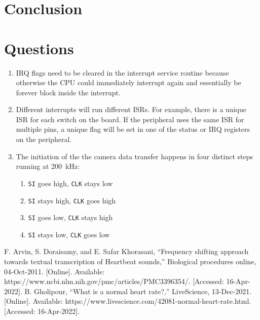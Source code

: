 \documentclass[CMPE]{../KGCOEReport}
\def\code#1{\texttt{#1}}
\begin{document}
	

    \section*{Conclusion}

	\section*{Questions}

	\begin{enumerate}
	\item
	IRQ flags need to be cleared in the interrupt service routine because otherwise
	the CPU could immediately interrupt again and essentially be forever block inside
	the interrupt.
	\item
	Different interrupts will run different ISRs. For example, there is a unique ISR for
	each switch on the board. If the peripheral uses the same ISR for multiple pins,
	a unique flag will be set in one of the status or IRQ registers on the peripheral.  
	\item
	The initiation of the the camera data transfer happens in four distinct steps
	running at \SI{200}{\kilo\Hz}:
	\begin{enumerate}
	\item \code{SI} goes high,
	      \code{CLK} stays low
	\item \code{SI} stays high,
		  \code{CLK} goes high
	\item \code{SI} goes low,
		  \code{CLK} stays high
	\item \code{SI} stays low,
		  \code{CLK} goes low
	\end{enumerate}
	\end{enumerate}

	\begin{thebibliography}{00}
 F. Arvin, S. Doraisamy, and E. Safar Khorasani, “Frequency shifting approach towards textual transcription of Heartbeat sounds,” Biological procedures online, 04-Oct-2011. [Online]. Available: https://www.ncbi.nlm.nih.gov/pmc/articles/PMC3396354/. [Accessed: 16-Apr-2022].
 B. Gholipour, “What is a normal heart rate?,” LiveScience, 13-Dec-2021. [Online]. Available: https://www.livescience.com/42081-normal-heart-rate.html. [Accessed: 16-Apr-2022].
	\end{thebibliography}
\end{document}
